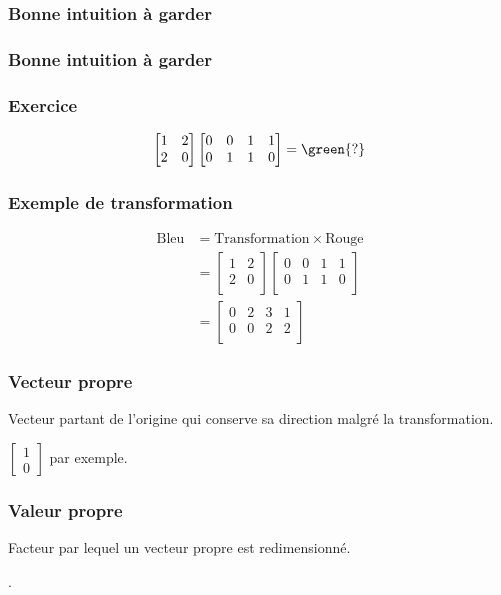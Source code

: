 \begin{frame}
  \frametitle{Bonne intuition à garder}

\end{frame}

\begin{frame}
  \frametitle{Bonne intuition à garder}

\end{frame}

\begin{frame}
  \frametitle{Exercice}
  \[
    \begin{bmatrix}
      1 & 2 \\
      2 & 0 \\
    \end{bmatrix}
    \begin{bmatrix}
      0 & 0 & 1 & 1 \\
      0 & 1 & 1 & 0 \\
    \end{bmatrix}
    = \green{?}
  \]
\end{frame}

\begin{frame}
  \frametitle{Exemple de transformation}

  \[
    \begin{aligned}
      \text{Bleu} & = \text{Transformation} \times \text{Rouge} \\
      & = \begin{bmatrix}
        1 & 2 \\
        2 & 0 \\
      \end{bmatrix}
      \begin{bmatrix}
        0 & 0 & 1 & 1 \\
        0 & 1 & 1 & 0 \\
      \end{bmatrix} \\
      & = \begin{bmatrix}
        0 & 2 & 3 & 1 \\
        0 & 0 & 2 & 2 \\
      \end{bmatrix}
    \end{aligned}
  \]
\end{frame}

\begin{frame}
  \frametitle{Vecteur propre}


  Vecteur partant de l'origine qui conserve sa direction malgré la transformation.

   \pause
  $\begin{bmatrix}1 \\0\end{bmatrix}$ par exemple.
\end{frame}

\begin{frame}
  \frametitle{Valeur propre}


  Facteur par lequel un vecteur propre est redimensionné.

   .
\end{frame}
